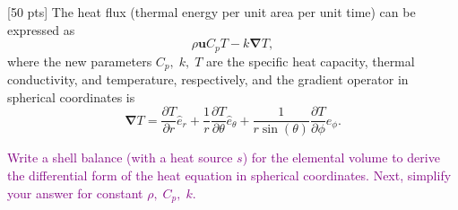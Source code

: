 \documentclass[12pt]{article}
\begin{document}
\begin{ex}
    
[50 pts] The heat flux (thermal energy per unit area per unit time) can be expressed as
$$\rho\mathbf{u}C_p T-k\mathbf{\nabla} T,$$
where the new parameters $C_p,\;k,\;T$ are the specific heat capacity, thermal conductivity, and temperature, respectively, and the gradient operator in spherical coordinates is
$$\mathbf{\nabla} T=\frac{\partial T}{\partial r}\hat{e}_r+\frac{1}{r}\frac{\partial T}{\partial\theta}\hat{e}_{\theta}+\frac{1}{r\sin(\theta)}\frac{\partial T}{\partial\phi}\hat{e}_{\phi}.$$

\textcolor{purple}{Write a shell balance (with a heat source $s$) for the elemental volume to derive the differential form of the heat equation in spherical coordinates. Next, simplify your answer for constant $\rho,\;C_p,\;k$.}
		

\end{ex}
\end{document}
